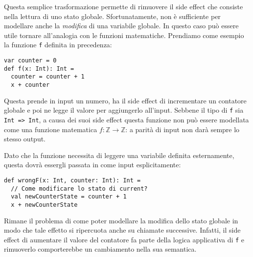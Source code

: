  Questa semplice trasformazione permette di rimuovere il side effect che consiste nella lettura di uno stato globale.
  Sfortunatamente, non è sufficiente per modellare anche la \emph{modifica} di una variabile globale. In questo caso può essere utile tornare all'analogia con le funzioni matematiche.
  Prendiamo come esempio la funzione \lstinline{f} definita in precedenza:
  \begin{lstlisting}[language=scala3]
var counter = 0
def f(x: Int): Int =
  counter = counter + 1 
  x + counter
\end{lstlisting}
  Questa prende in input un numero, ha il side effect di incrementare un contatore globale e poi ne legge il valore per aggiungerlo all'input. Sebbene il tipo di \lstinline{f} sia \lstinline{Int => Int}, a causa dei suoi side effect questa funzione non può essere modellata come una funzione matematica $f: \mathbb{Z} \rightarrow \mathbb{Z}$: a parità di input non darà sempre lo stesso output.

  Dato che la funzione necessita di leggere una variabile definita esternamente, questa dovrà essergli passata in come input esplicitamente:
  \begin{lstlisting}[language=scala3]
def wrongF(x: Int, counter: Int): Int =
  // Come modificare lo stato di current?
  val newCounterState = counter + 1
  x + newCounterState
\end{lstlisting}
  Rimane il problema di come poter modellare la modifica dello stato globale in modo che tale effetto si ripercuota anche su chiamate successive. Infatti, il side effect di aumentare il valore del contatore fa parte della logica applicativa di \lstinline{f} e rimuoverlo comporterebbe un cambiamento nella sua semantica.

